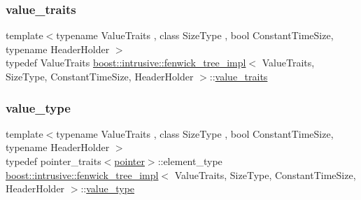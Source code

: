\mbox{\label{classboost_1_1intrusive_1_1fenwick__tree__impl_a2e87a9b3164c911991b62a4405bdca5f}} 
\subsubsection{\texorpdfstring{value\+\_\+traits}{value\_traits}}
{\footnotesize\ttfamily template$<$typename Value\+Traits , class Size\+Type , bool Constant\+Time\+Size, typename Header\+Holder $>$ \\
typedef Value\+Traits \hyperlink{classboost_1_1intrusive_1_1fenwick__tree__impl}{boost\+::intrusive\+::fenwick\+\_\+tree\+\_\+impl}$<$ Value\+Traits, Size\+Type, Constant\+Time\+Size, Header\+Holder $>$\+::\hyperlink{classboost_1_1intrusive_1_1fenwick__tree__impl_a2e87a9b3164c911991b62a4405bdca5f}{value\+\_\+traits}}

\mbox{\label{classboost_1_1intrusive_1_1fenwick__tree__impl_aefd70a2712872e79b867c1a5c59a4a26}} 
\subsubsection{\texorpdfstring{value\+\_\+type}{value\_type}}
{\footnotesize\ttfamily template$<$typename Value\+Traits , class Size\+Type , bool Constant\+Time\+Size, typename Header\+Holder $>$ \\
typedef pointer\+\_\+traits$<$\hyperlink{classboost_1_1intrusive_1_1fenwick__tree__impl_a5900d4b71e9c5715db38a848acbe270b}{pointer}$>$\+::element\+\_\+type \hyperlink{classboost_1_1intrusive_1_1fenwick__tree__impl}{boost\+::intrusive\+::fenwick\+\_\+tree\+\_\+impl}$<$ Value\+Traits, Size\+Type, Constant\+Time\+Size, Header\+Holder $>$\+::\hyperlink{classboost_1_1intrusive_1_1fenwick__tree__impl_aefd70a2712872e79b867c1a5c59a4a26}{value\+\_\+type}}



